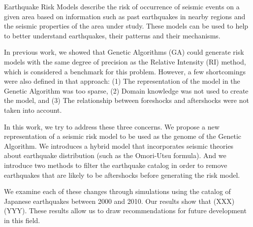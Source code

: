 Earthquake Risk Models describe the risk of occurrence of seismic
events on a given area based on information such as past earthquakes
in nearby regions and the seismic properties of the area under study.
These models can be used to help to better understand earthquakes,
their patterns and their mechanisms.

In previous work, we showed that Genetic Algorithms (GA) could
generate risk models with the same degree of precision as the Relative
Intensity (RI) method, which is considered a benchmark for this
problem.  However, a few shortcomings were also defined in that
approach: (1) The representation of the model in the Genetic Algorithm
was too sparse, (2) Domain knowledge was not used to create the model,
and (3) The relationship between foreshocks and aftershocks were not 
taken into account.

In this work, we try to address these three concerns. We propose a new
representation of a seismic risk model to be used as the genome of the
Genetic Algorithm. We introduces a hybrid model that incorporates
seismic theories about earthquake distribution (such as the Omori-Utsu
formula). And we introduce two methods to filter the earthquake catalog 
in order to remove earthquakes that are likely to be aftershocks before
generating the risk model.

We examine each of these changes through simulations using the catalog
of Japanese earthquakes between 2000 and 2010. Our results show that 
(XXX)(YYY). These results allow us to draw recommendations for future 
development in this field.
